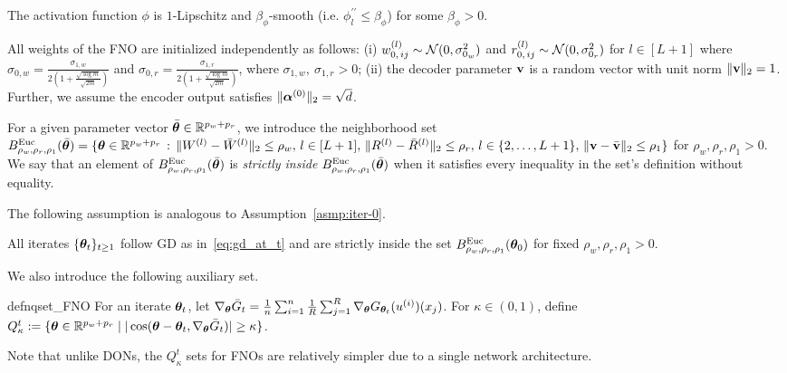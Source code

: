 \begin{asmp}
\label{asmp:Activation_Function_FNO}
The activation function $\phi$ is $1$-Lipschitz and $\beta_{\phi}$-smooth (i.e. $\phi_l^{\prime\prime}\leq \beta_{\phi}$) for some $\beta_{\phi} > 0$.
\end{asmp}
\begin{asmp}
\label{asmp:smoothinit_FNO}
All weights of the FNO are initialized independently as follows: (i) $w^{(l)}_{{0,\,ij}}\sim {\mathcal{N}} (0, \sigma^2_{0_w})$ and $r^{(l)}_{{0,\,ij}}\sim {\mathcal{N}} (0, \sigma^2_{0_r})$ for $l\in [L+1]$ where $\sigma_{0,w} = \frac{\sigma_{1,w}}{2(1+\frac{\sqrt{\log m}}{\sqrt{2m}})}$ and $\sigma_{0,r} = \frac{\sigma_{1,r}}{2(1+\frac{\sqrt{\log m}}{\sqrt{2m}})}$, where $\sigma_{1,w},\ \sigma_{1,r} > 0$; (ii) the decoder parameter $\mathbf{v}$ is a random vector with unit norm $\lVert\mathbf{v}\rVert_2=1$. Further, we assume the encoder output satisfies $\lVert\boldsymbol{\alpha}^{(0)}\rVert_2=\sqrt{d}$.
\end{asmp}

For a given parameter vector $\bar{{\bm{\theta}}}\in{\mathbb{R}}^{p_w+p_r}$, we introduce the neighborhood set  
$B^{\mathrm{Euc}}_{\rho_w,\rho_r,\rho_1}(\bar{{\bm{\theta}}})=\{{\bm{\theta}}\in\mathbb{R}^{p_w+p_r}\,:\,\lVert W^{(l)}-\bar{W}^{(l)}\rVert_2\leq \rho_w,\,l\in[L+1],\,\lVert R^{(l)}-\bar{R}^{(l)}\rVert_2\leq \rho_r,\,l\in\{2,\dots,L+1\},\,\lVert\mathbf{v}-\bar{\mathbf{v}}\rVert_2\leq \rho_1\}$ for $\rho_w,\rho_r,\rho_1>0$. 
%
We say that an element of $B^{\mathrm{Euc}}_{\rho_w,\rho_r,\rho_1}(\bar{{\bm{\theta}}})$ is \emph{strictly inside} $B^{\mathrm{Euc}}_{\rho_w,\rho_r,\rho_1}(\bar{{\bm{\theta}}})$ when it satisfies every inequality in the set's definition without equality.

The following assumption is analogous to Assumption~\ref{asmp:iter-0}.

\begin{asmp}
\label{asmp:iter-2}
All iterates $\{{\bm{\theta}}_t\}_{t\geq 1}$ follow GD as in~\eqref{eq:gd_at_t} and are strictly inside the set $B^{\mathrm{Euc}}_{\rho_w,\rho_r,\rho_1}({\bm{\theta}}_0)$ for fixed $\rho_w,\rho_r,\rho_1>0$.
\end{asmp}

We also introduce the following auxiliary set. %
\begin{restatable}{defn}{qset_FNO} 
For an iterate ${\bm{\theta}}_t$, let $\nabla_{{\bm{\theta}}}\bar{G}_t =  \frac{1}{n} \sum_{i=1}^n \frac{1}{R}  \sum_{j=1}^{R} \nabla_{{\bm{\theta}}}G_{{\bm{\theta}}_t}(u^{(i)})(x_j)$. For $\kappa \in (0,1)$, define $Q^t_{\kappa} := \{ {\bm{\theta}} \in {\mathbb{R}}^{p_w + p_r} \mid |\cos({\bm{\theta}}-{\bm{\theta}}_t, \nabla_{{\bm{\theta}}}\bar{G}_t)| \geq \kappa \}$.
\label{defn:qset_FNO}
\end{restatable}
Note that unlike DONs, the $Q^t_{\kappa}$ sets for FNOs are relatively simpler due to a single network architecture. 

